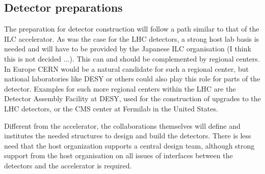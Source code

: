 \documentclass[%
 reprint,
 amsmath,amssymb,
 aps,
]{revtex4-1}
\begin{document}
\subsection{Detector preparations~\label{sec:prepphase:detectors}}
The preparation for detector construction will follow a path similar to that of the \acs{ILC} accelerator.
As was the case for the LHC detectors, a strong host lab basis is needed and will have to be provided by the Japanese ILC organisation (I think this is not decided ...).
This can and should be complemented by regional centers. In Europe CERN would be a natural candidate for such a regional center, but national laboratories like DESY or others could also play this role for parts of the detector. Examples for such more regional centers within the LHC are the Detector Assembly Facility at DESY, used for the construction of upgrades to the LHC detectors, or the CMS center at Fermilab in the United States. 

Different from the accelerator, the collaborations themselves will define and institutes the needed structures to design and build the detectors. There is less need that the host organization supports a central design team, although strong support from the host organisation on all issues of interfaces between the detectors and the accelerator is required. 
\end{document}
